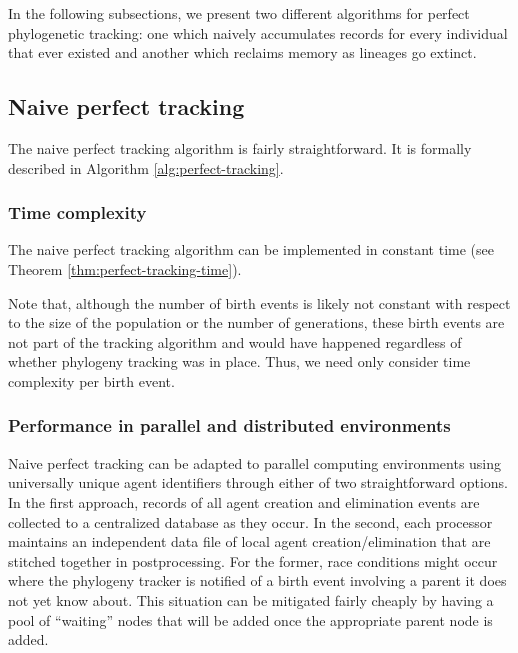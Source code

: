 In the following subsections, we present two different algorithms for perfect phylogenetic tracking: one which naively accumulates records for every individual that ever existed and another which reclaims memory as lineages go extinct.

\subsection{Naive perfect tracking}
\label{sec:naive-perfect-tracking}

The naive perfect tracking algorithm is fairly straightforward.
It is formally described in Algorithm \ref{alg:perfect-tracking}.



\subsubsection{Time complexity}

The naive perfect tracking algorithm can be implemented in constant time (see Theorem \ref{thm:perfect-tracking-time}).



Note that, although the number of birth events is likely not constant with respect to the size of the population or the number of generations,
these birth events are not part of the tracking algorithm and would have happened regardless of whether phylogeny tracking was in place.
Thus, we need only consider time complexity per birth event.

\subsubsection{Performance in parallel and distributed environments}
\label{sec:perfect-tracking-distrbuted}

Naive perfect tracking can be adapted to parallel computing environments using universally unique agent identifiers through either of two straightforward options.
In the first approach, records of all agent creation and elimination events are collected to a centralized database as they occur.
In the second, each processor maintains an independent data file of local agent creation/elimination that are stitched together in postprocessing.
For the former, race conditions might occur where the phylogeny tracker is notified of a birth event involving a parent it does not yet know about.
This situation can be mitigated fairly cheaply by having a pool of ``waiting'' nodes that will be added once the appropriate parent node is added.

